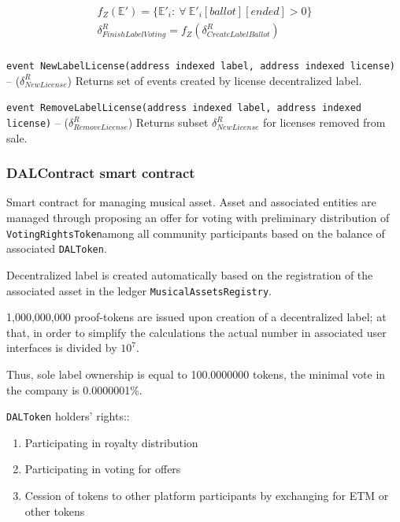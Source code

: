 \documentclass[12pt]{report}
\def\code#1{\colorbox{light-gray}{\texttt{#1}}}
\begin{document}
\begin{equation}
\begin{aligned}
f_Z(\mathbb{E}') = \{\mathbb{E}'_i : \ \forall \ \mathbb{E}'_i[ballot][ended] > 0 \} \\
\delta^R_{FinishLabelVoting} = f_Z(\delta^R_{CreateLabelBallot}) \\
\end{aligned}
\end{equation}

\code{event NewLabelLicense(address indexed label, address indexed license)} – ($\delta^R_{NewLicense}$)\hfill\null\linebreak
Returns set of events created by license decentralized label.

\code{event RemoveLabelLicense(address indexed label, address indexed license)} – ($\delta^R_{RemoveLicense}$)\hfill\null\linebreak
Returns subset $\delta^R_{NewLicense}$ for licenses removed from sale.

\subsubsection{DALContract smart contract}
\label{tech-apps-dal-label}
Smart contract for managing musical asset. Asset and associated entities are managed through proposing an offer for voting with preliminary distribution of \code{VotingRightsToken}among all community participants based on the balance of associated \code{DALToken}.
 
Decentralized label is created automatically based on the registration of the associated asset in the ledger \code{MusicalAssetsRegistry}.

1,000,000,000 proof-tokens are issued upon creation of a decentralized label; at that, in order to simplify the calculations the actual number in associated user interfaces is divided by $10^7$. 

Thus, sole label ownership is equal to 100.0000000 tokens, the minimal vote in the company is 0.0000001\%.

\code{DALToken} holders' rights::
\begin{enumerate}
	\item Participating in royalty distribution
	\item Participating in voting for offers
	\item Cession of tokens to other platform participants by exchanging for ETM or other tokens
\end{enumerate}
\end{document}
